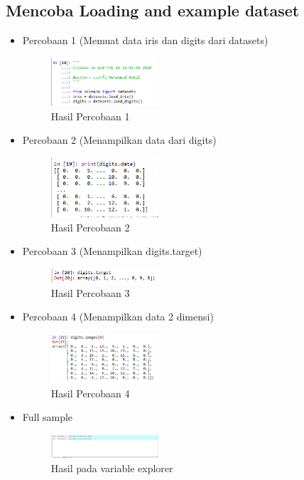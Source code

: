 \subsection{Mencoba Loading and example dataset}
\begin{itemize}
	\item Percobaan 1 (Memuat data iris dan digits dari datasets) \hfill \break 
	\begin{figure}[H]
		\includegraphics[width=4cm]{figures/1174035/chapter1/2_1_hasil.png}
		\centering
		\caption{Hasil Percobaan 1}
	\end{figure}
	\item Percobaan 2 (Menampilkan data dari digits) \hfill \break 
	\begin{figure}[H]
		\includegraphics[width=4cm]{figures/1174035/chapter1/2_2_hasil.png}
		\centering
		\caption{Hasil Percobaan 2}
	\end{figure}
	\item Percobaan 3 (Menampilkan digits.target) \hfill \break 
	\begin{figure}[H]
		\includegraphics[width=4cm]{figures/1174035/chapter1/2_3_hasil.png}
		\centering
		\caption{Hasil Percobaan 3}
	\end{figure}
	\item Percobaan 4 (Menampilkan data 2 dimensi) \hfill \break 
	\begin{figure}[H]
		\includegraphics[width=4cm]{figures/1174035/chapter1/2_4_hasil.png}
		\centering
		\caption{Hasil Percobaan 4}
	\end{figure}
	\item Full sample \hfill \break 
	\begin{figure}[H]
		\includegraphics[width=4cm]{figures/1174035/chapter1/2_var.png}
		\centering
		\caption{Hasil pada variable explorer}
	\end{figure}
\end{itemize}
